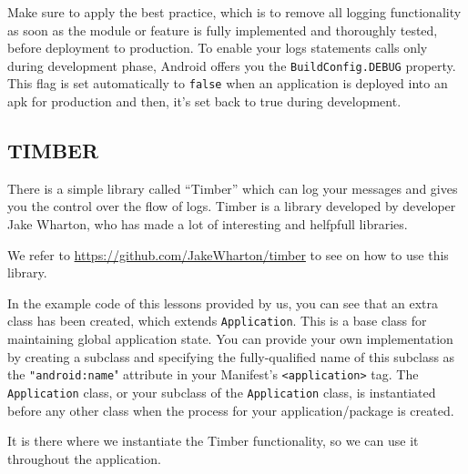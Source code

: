 Make sure to apply the best practice, which is to remove all logging functionality as soon as the module or feature is fully implemented and thoroughly tested, before deployment to production. To enable your logs statements calls only during development phase, Android offers you the \lstinline|BuildConfig.DEBUG| property. This flag is set  automatically to \lstinline|false| when an application is deployed into an \gls{apk} for production and then, it’s set back to true during development.

\subsection{TIMBER}
There is a simple library called “Timber” which can log your messages and gives you the control over the flow of logs. Timber is a  library developed by  developer Jake Wharton, who has made a lot of interesting and helfpfull libraries.

We refer to \url{https://github.com/JakeWharton/timber} to see on how to use this library. 

In the example code of this lessons provided by us, you can see that an extra class has been created, which extends \lstinline|Application|. This  is a base class for maintaining global application state. You can provide your own implementation by creating a subclass and specifying the fully-qualified name of this subclass as the \lstinline|"android:name|" attribute in your Manifest's \lstinline|<application>| tag. The \lstinline|Application| class, or your subclass of the \lstinline|Application| class, is instantiated before any other class when the process for your application/package is created. 

It is there where we instantiate the Timber functionality, so we can use it throughout the application. 




